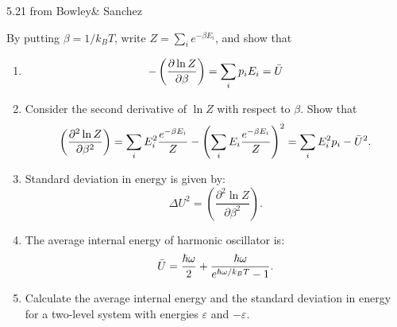         \begin{eocproblem*}{5.21 from Bowley\& Sanchez}
            {By putting $\beta = 1/k_B T$, write $Z = \sum_i e^{-\beta E_i}$, and show that
            \begin{enumerate}[label=(\alph*)]
            \item \begin{equation*}
                -\left(\frac{\partial \ln Z}{\partial\beta}\right) = \sum_i p_i E_i = \Bar{U}
            \end{equation*}
            \item Consider the second derivative of $\ln Z$ with respect to $\beta$. Show that
             \begin{equation*}
                 \left(\frac{\partial^2 \ln Z}{\partial\beta^2}\right) = \sum_i E_i^2 \frac{e^{-\beta E_i}}{Z} - \left(\sum_i E_i \frac{e^{-\beta E_i}}{Z}\right)^2 =\sum_i E_i^2 p_i - \Bar{U}^2 .
            \end{equation*}
            \item Standard deviation in energy is given by:
            \begin{equation*}
                \Delta U^2=\left(\frac{\partial^2 \ln Z}{\partial\beta^2}\right).
            \end{equation*}
            \item The average internal energy of harmonic oscillator is:
            \begin{equation*}
                \Bar{U}=\frac{\hbar\omega}{2}+\frac{\hbar\omega}{e^{\hbar\omega/k_BT}-1}.
            \end{equation*}
            \item Calculate the average internal energy and the standard deviation in energy for a two-level system with energies $\varepsilon$ and $-\varepsilon$.
            \end{enumerate}
            }
        \end{eocproblem*}
